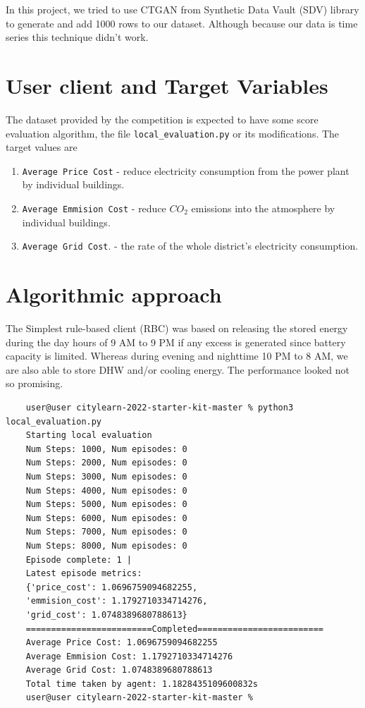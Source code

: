 \documentclass{article}
\numberwithin{equation}{subsection}
\begin{document}
In this project, we tried to use CTGAN from Synthetic Data Vault (SDV) library to generate and add 1000 rows to our dataset. Although because our data is time series this technique didn't work.

\section{User client and Target Variables}

The dataset provided by the competition is expected to have some score evaluation algorithm, the file \verb!local_evaluation.py! or its modifications. The target values are 
\begin{enumerate}
	\item \verb!Average Price Cost! - reduce electricity consumption from the power plant by individual buildings.
	\item \verb!Average Emmision Cost! - reduce $CO_2$ emissions into the atmosphere by individual buildings.
	\item \verb!Average Grid Cost!. - the rate of the whole district's electricity consumption.
\end{enumerate}








\section{Algorithmic approach}

The Simplest rule-based client (RBC) was based on releasing the stored energy during the day hours of 9 AM to 9 PM if any excess is generated since battery capacity is limited. Whereas during evening and nighttime 10 PM to 8 AM, we are also able to store DHW and/or cooling energy. The performance looked not so promising. 

\begin{verbatim}
	user@user citylearn-2022-starter-kit-master % python3 local_evaluation.py 
	Starting local evaluation
	Num Steps: 1000, Num episodes: 0
	Num Steps: 2000, Num episodes: 0
	Num Steps: 3000, Num episodes: 0
	Num Steps: 4000, Num episodes: 0
	Num Steps: 5000, Num episodes: 0
	Num Steps: 6000, Num episodes: 0
	Num Steps: 7000, Num episodes: 0
	Num Steps: 8000, Num episodes: 0
	Episode complete: 1 | 
	Latest episode metrics: 
	{'price_cost': 1.0696759094682255, 
	'emmision_cost': 1.1792710334714276, 
	'grid_cost': 1.0748389680788613}
	=========================Completed=========================
	Average Price Cost: 1.0696759094682255
	Average Emmision Cost: 1.1792710334714276
	Average Grid Cost: 1.0748389680788613
	Total time taken by agent: 1.1828435109600832s
	user@user citylearn-2022-starter-kit-master % 
\end{verbatim}
\end{document}
